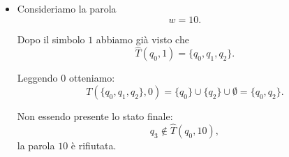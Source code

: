 \begin{exam}
\begin{itemize}
Applicando successivamente le $\epsilon$-mosse:
\[
T^0(\{q_0,q_1\},\epsilon)=\{q_0,q_1\},
\]
\[
T^1(\{q_0,q_1\},\epsilon)
=
T(\{q_0,q_1\},\epsilon)
=
\{q_2\}.
\]

Quindi dopo il primo simbolo:
\[
\widehat{T}(q_0,1)
=
\{q_0,q_1,q_2\}.
\]

Ora leggiamo il simbolo $0$:
\[
T(\{q_0,q_1,q_2\},0)
=
\{q_0\}\cup\{q_2\}\cup\emptyset
=
\{q_0,q_2\}.
\]

Non sono possibili ulteriori $\epsilon$-mosse, quindi:
\[
\widehat{T}(q_0,10)=\{q_0,q_2\}.
\]

Infine leggiamo $1$:
\[
T(\{q_0,q_2\},1)
=
\{q_0,q_1\}\cup\{q_3\}
=
\{q_0,q_1,q_3\}.
\]

Poiché
\[
q_3\in\widehat{T}(q_0,101),
\]
la parola $101$ è accettata.

\item Consideriamo la parola
\[
w=10.
\]

Dopo il simbolo $1$ abbiamo già visto che
\[
\widehat{T}(q_0,1)=\{q_0,q_1,q_2\}.
\]

Leggendo $0$ otteniamo:
\[
T(\{q_0,q_1,q_2\},0)
=
\{q_0\}\cup\{q_2\}\cup\emptyset
=
\{q_0,q_2\}.
\]

Non essendo presente lo stato finale:
\[
q_3\notin\widehat{T}(q_0,10),
\]
la parola $10$ è rifiutata.

\end{itemize}

\end{exam}

